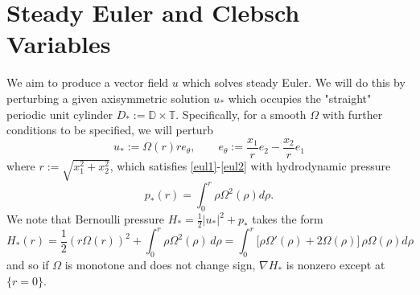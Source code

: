 \documentclass[11pt]{article}
\theoremstyle{plain}
\numberwithin{equation}{section}
\theoremstyle{remark}
\newcommand{\rmd}{{\rm d}}
\newcommand{\be}{\begin{equation}}
\newcommand{\ee}{\end{equation}}
\begin{document}
\section{Steady Euler and Clebsch Variables}

We aim to produce a vector field $u$ which solves steady Euler.  We will do this by perturbing  a given axisymmetric solution $u_*$
which occupies the  "straight" periodic unit cylinder $D_* := \mathbb{D} \times \mathbb{T}$. Specifically, for a smooth $\Omega$ with further conditions to be specified, we will perturb
 \be\label{ustar}
u_*:= \Omega(r)re_\theta, \qquad e_\theta:= \frac{x_1}{r} e_2 - \frac{x_2}{r}e_1
\ee
where $r:= \sqrt{x_1^2+ x_2^2}$, which satisfies \eqref{eul1}-\eqref{eul2} with hydrodynamic pressure
$$
    p_*(r) = \int_0^r \rho \Omega^2(\rho) d\rho.
$$
We note  that Bernoulli pressure $H_* = \frac{1}{2} |u_*|^2 + p_*$ takes the form
$$
    H_*(r) = \frac{1}{2} (r\Omega(r))^2 + \int_0^r \rho \Omega^2(\rho)\, d\rho
    =  \int_0^r\Big[ \rho \Omega'(\rho)+ 2 \Omega(\rho)\Big]\, \rho \Omega(\rho) d\rho
    $$
and so if $\Omega$ is monotone and does not change sign,
$\nabla H_*$ is nonzero except at $\{r=0\}$.  
\end{document}
